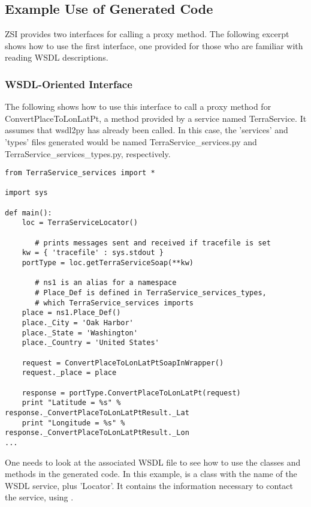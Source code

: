 \subsection{Example Use of Generated Code}

ZSI provides two interfaces for calling a proxy method.
The following excerpt shows how to use the first interface, one provided
for those who are familiar with reading WSDL descriptions.

\subsubsection{WSDL-Oriented Interface}
The following shows how to use this interface to call a proxy method for
ConvertPlaceToLonLatPt, a method provided by a service
named TerraService. It assumes that wsdl2py has already been called.
In this case, the 'services' and 'types' files generated would
be named TerraService_services.py and TerraService_services_types.py,
respectively.

\begin{verbatim}
from TerraService_services import *

import sys

def main():
    loc = TerraServiceLocator()

       # prints messages sent and received if tracefile is set
    kw = { 'tracefile' : sys.stdout }
    portType = loc.getTerraServiceSoap(**kw)

       # ns1 is an alias for a namespace
       # Place_Def is defined in TerraService_services_types,
       # which TerraService_services imports
    place = ns1.Place_Def()
    place._City = 'Oak Harbor'
    place._State = 'Washington'
    place._Country = 'United States'

    request = ConvertPlaceToLonLatPtSoapInWrapper()
    request._place = place

    response = portType.ConvertPlaceToLonLatPt(request)
    print "Latitude = %s" % response._ConvertPlaceToLonLatPtResult._Lat
    print "Longitude = %s" % response._ConvertPlaceToLonLatPtResult._Lon
...

\end{verbatim}

One needs to look at the associated WSDL file to see how
to use the classes and methods in the generated code.
In this example, 
is a class with the name of the WSDL service, plus 'Locator'.  It contains the
information necessary to contact the service, using
.

